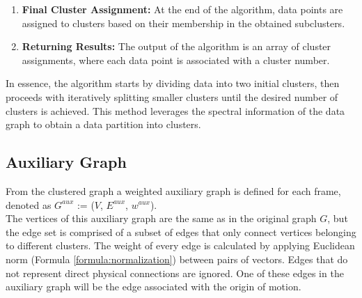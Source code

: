 \begin{enumerate}
  \item \textbf{Final Cluster Assignment:}
  At the end of the algorithm, data points are assigned to clusters based on their membership in the obtained subclusters.
  
  \item \textbf{Returning Results:}
  The output of the algorithm is an array of cluster assignments, where each data point is associated with a cluster number.
  
\end{enumerate}

In essence, the algorithm starts by dividing data into two initial clusters, then proceeds with iteratively splitting smaller clusters until the desired number of clusters is achieved.
This method leverages the spectral information of the data graph to obtain a data partition into clusters.


\subsection{Auxiliary Graph}
From the clustered graph a weighted auxiliary graph is defined for each frame, denoted as $G^{aux}$ := ($V$, $E^{aux}$, $w^{aux}$). \\
The vertices of this auxiliary graph are the same as in the original graph $G$, but the edge set is comprised of a subset of edges that only connect vertices belonging to different clusters.
The weight of every edge is calculated by applying Euclidean norm (Formula \ref{formula:normalization}) between pairs of vectors.
Edges that do not represent direct physical connections are ignored.
One of these edges in the auxiliary graph will be the edge associated with the origin of motion.
\\

